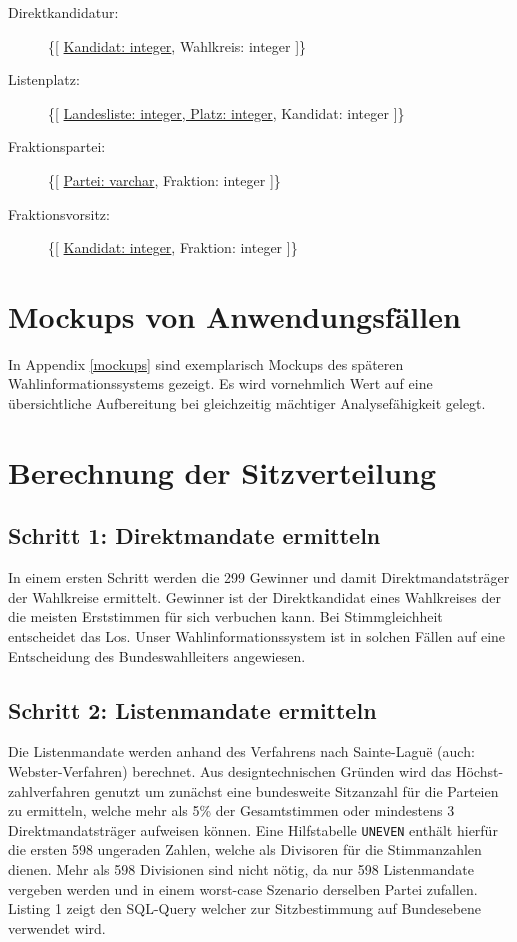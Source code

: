 \documentclass[a4paper]{article}
\begin{document}
\begin{description}

\item[Direktkandidatur:] \{[ \underline{Kandidat: integer}, Wahlkreis: integer ]\}

\item[Listenplatz:] \{[ \underline{Landesliste: integer, Platz: integer}, Kandidat: integer ]\}

\item[Fraktionspartei:] \{[ \underline{Partei: varchar}, Fraktion: integer ]\}

\item[Fraktionsvorsitz:] \{[ \underline{Kandidat: integer}, Fraktion: integer ]\}

\end{description}

\section{Mockups von Anwendungsfällen}

In Appendix \ref{mockups} sind exemplarisch Mockups des späteren Wahlinformationssystems gezeigt. Es wird vornehmlich Wert auf eine übersichtliche Aufbereitung bei gleichzeitig mächtiger Analysefähigkeit gelegt.

\section{Berechnung der Sitzverteilung}

\subsection{Schritt 1: Direktmandate ermitteln}

In einem ersten Schritt werden die 299 Gewinner und damit Direktmandatsträger der Wahlkreise ermittelt. Gewinner ist der Direktkandidat eines Wahlkreises der die meisten Erststimmen für sich verbuchen kann. Bei Stimmgleichheit entscheidet das Los. Unser Wahlinformationssystem ist in solchen Fällen auf eine Entscheidung des Bundeswahlleiters angewiesen.

\subsection{Schritt 2: Listenmandate ermitteln}

Die Listenmandate werden anhand des Verfahrens nach Sainte-Laguë (auch: Webster-Verfahren) berechnet. Aus designtechnischen Gründen wird das Höchst-zahlverfahren genutzt um zunächst eine bundesweite Sitzanzahl für die Parteien zu ermitteln, welche mehr als 5\% der Gesamtstimmen oder mindestens 3 Direktmandatsträger aufweisen können. Eine Hilfstabelle \texttt{UNEVEN} enthält hierfür die ersten 598 ungeraden Zahlen, welche als Divisoren für die Stimmanzahlen dienen. Mehr als 598 Divisionen sind nicht nötig, da nur 598 Listenmandate vergeben werden und in einem worst-case Szenario derselben Partei zufallen. Listing 1 zeigt den SQL-Query welcher zur Sitzbestimmung auf Bundesebene verwendet wird.
\end{document}
